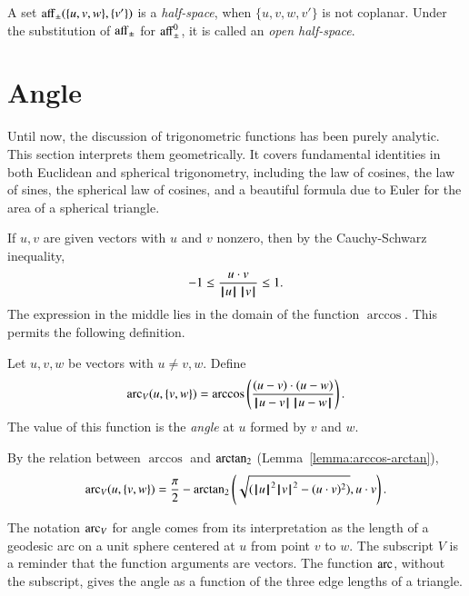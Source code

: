 \begin{definition} A set ${\operatorname{aff}}_{\pm}(\{u,v,w\},\{v'\})$ is a {\it half-space},
when $\{u,v,w,v'\}$ is not coplanar.  Under the substitution of
${\operatorname{aff}}_{\pm}$ for ${\operatorname{aff}}_{\pm}^0$, it is called an
{\it open half-space}.
\end{definition}
%
%

\section{Angle}\label{sec:angle}

Until now, the discussion of trigonometric functions has been purely analytic.  This section
interprets them geometrically.
It covers fundamental identities
in both Euclidean and spherical trigonometry, including the law
of cosines, the law of sines, the spherical law of cosines, 
and a beautiful formula due to Euler for
the area of a spherical triangle.

If $u,v$ are given vectors with $u$ and $v$ nonzero, then by the
Cauchy-Schwarz inequality,
    $$-1 \le \frac{u\cdot v}{{{\hskip0.1em|\hskip-0.15em|\hskip0.1em}u{\hskip0.1em|\hskip-0.15em|\hskip0.1em}}\,{{\hskip0.1em|\hskip-0.15em|\hskip0.1em}v{\hskip0.1em|\hskip-0.15em|\hskip0.1em}}} \le 1.$$
The expression in the middle lies in the domain of the function $\arccos$. This permits the following definition.
%
%
%

\begin{definition}\label{def:angle}
Let $u,v,w$ be vectors with $u\ne v,w$.
Define 
    $$
    \operatorname{arc}_V(u,\{v,w\}) = \arccos\left(\frac{(u-v)\cdot (u-w)}{{\hskip0.1em|\hskip-0.15em|\hskip0.1em}u - v{\hskip0.1em|\hskip-0.15em|\hskip0.1em}\,{\hskip0.1em|\hskip-0.15em|\hskip0.1em}u - w{\hskip0.1em|\hskip-0.15em|\hskip0.1em}}\right).
    $$
The value of this function is the {\it angle} at $u$ formed by $v$ and $w$.
%
%
%
%
%
\end{definition}

By the relation between $\arccos$ and ${\operatorname{arctan_2}}$
(Lemma~\ref{lemma:arccos-arctan}), %
    \begin{equation}\label{eqn:angle}
    \operatorname{arc}_V(u,\{v,w\}) = \frac{\pi}2 - {\operatorname{arctan_2}}\left ({\sqrt{({{\hskip0.1em|\hskip-0.15em|\hskip0.1em}u{\hskip0.1em|\hskip-0.15em|\hskip0.1em}}^2{{\hskip0.1em|\hskip-0.15em|\hskip0.1em}v{\hskip0.1em|\hskip-0.15em|\hskip0.1em}}^2 -
    (u\cdot v)^2)}}, {u\cdot v}\right).
    \end{equation}
%

The notation $\operatorname{arc}_V$ for angle comes from its interpretation as the
length of a geodesic arc on a unit sphere
centered at $u$ from point $v$ to $w$.
%
The subscript $V$ is a reminder that
the function arguments are vectors.  The function
$\operatorname{arc}$, without the subscript,  gives the angle as a function
of the three edge lengths of a triangle.
%
%
%

